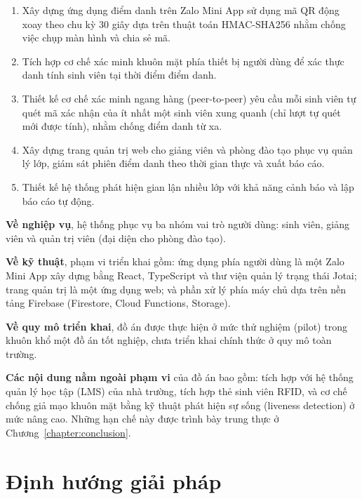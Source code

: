\documentclass[../main.tex]{subfiles}
\begin{document}
\begin{enumerate}[leftmargin=1.5em]
  \item Xây dựng ứng dụng điểm danh trên Zalo Mini App sử dụng mã QR động xoay theo chu
  kỳ 30 giây dựa trên thuật toán HMAC-SHA256 nhằm chống việc chụp màn hình và chia sẻ mã.

  \item Tích hợp cơ chế xác minh khuôn mặt phía thiết bị người dùng để xác thực danh
  tính sinh viên tại thời điểm điểm danh.

  \item Thiết kế cơ chế xác minh ngang hàng (peer-to-peer) yêu cầu mỗi sinh viên tự
  quét mã xác nhận của ít nhất một sinh viên xung quanh (chỉ lượt tự quét mới được tính), nhằm chống điểm danh từ xa.

  \item Xây dựng trang quản trị web cho giảng viên và phòng đào tạo phục vụ quản lý lớp,
  giám sát phiên điểm danh theo thời gian thực và xuất báo cáo.

  \item Thiết kế hệ thống phát hiện gian lận nhiều lớp với khả năng cảnh báo và lập báo
  cáo tự động.
\end{enumerate}

\textbf{Về nghiệp vụ}, hệ thống phục vụ ba nhóm vai trò người dùng: sinh viên, giảng
viên và quản trị viên (đại diện cho phòng đào tạo).

\textbf{Về kỹ thuật}, phạm vi triển khai gồm: ứng dụng phía người dùng là một Zalo Mini
App xây dựng bằng React, TypeScript và thư viện quản lý trạng thái Jotai; trang quản trị
là một ứng dụng web; và phần xử lý phía máy chủ dựa trên nền tảng Firebase (Firestore,
Cloud Functions, Storage).

\textbf{Về quy mô triển khai}, đồ án được thực hiện ở mức thử nghiệm (pilot) trong khuôn
khổ một đồ án tốt nghiệp, chưa triển khai chính thức ở quy mô toàn trường.

\textbf{Các nội dung nằm ngoài phạm vi} của đồ án bao gồm: tích hợp với hệ thống quản lý
học tập (LMS) của nhà trường, tích hợp thẻ sinh viên RFID, và cơ chế chống giả mạo khuôn
mặt bằng kỹ thuật phát hiện sự sống (liveness detection) ở mức nâng cao. Những hạn chế
này được trình bày trung thực ở Chương~\ref{chapter:conclusion}.

\section{Định hướng giải pháp}
\label{sec:dong-gop}
\end{document}
